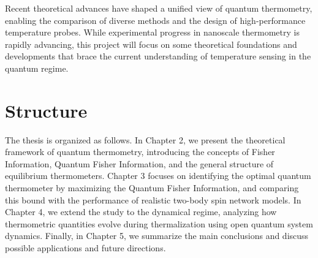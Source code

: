 Recent theoretical advances have shaped a unified view of quantum thermometry, enabling the comparison of diverse methods and the design of high-performance temperature probes. While experimental progress in nanoscale thermometry is rapidly advancing, this project will focus on some theoretical foundations and developments that brace the current understanding of temperature sensing in the quantum regime.

\section{Structure}
The thesis is organized as follows. In Chapter 2, we present the theoretical framework of quantum thermometry, introducing the concepts of Fisher Information, Quantum Fisher Information, and the general structure of equilibrium thermometers. Chapter 3 focuses on identifying the optimal quantum thermometer by maximizing the Quantum Fisher Information, and comparing this bound with the performance of realistic two-body spin network models. In Chapter 4, we extend the study to the dynamical regime, analyzing how thermometric quantities evolve during thermalization using open quantum system dynamics. Finally, in Chapter 5, we summarize the main conclusions and discuss possible applications and future directions.
